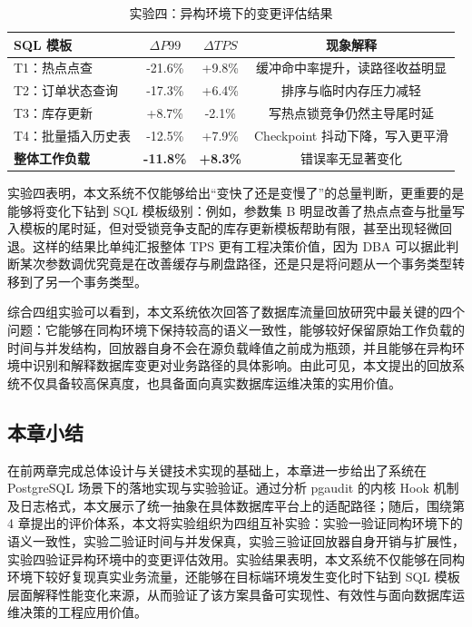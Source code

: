 \begin{table}[htbp]
    \centering
    \caption{实验四：异构环境下的变更评估结果}
    \label{tab:change_case_result}
    \begin{tabular}{lccc}
        \toprule
        \textbf{SQL 模板} & \textbf{$\Delta P99$} & \textbf{$\Delta TPS$} & \textbf{现象解释} \\
        \midrule
        T1：热点点查 & -21.6\% & +9.8\% & 缓冲命中率提升，读路径收益明显 \\
        T2：订单状态查询 & -17.3\% & +6.4\% & 排序与临时内存压力减轻 \\
        T3：库存更新 & +8.7\% & -2.1\% & 写热点锁竞争仍然主导尾时延 \\
        T4：批量插入历史表 & -12.5\% & +7.9\% & Checkpoint 抖动下降，写入更平滑 \\
        \midrule
        \textbf{整体工作负载} & \textbf{-11.8\%} & \textbf{+8.3\%} & 错误率无显著变化 \\
        \bottomrule
    \end{tabular}
\end{table}

实验四表明，本文系统不仅能够给出“变快了还是变慢了”的总量判断，更重要的是能够将变化下钻到 SQL 模板级别：例如，参数集 B 明显改善了热点点查与批量写入模板的尾时延，但对受锁竞争支配的库存更新模板帮助有限，甚至出现轻微回退。这样的结果比单纯汇报整体 TPS 更有工程决策价值，因为 DBA 可以据此判断某次参数调优究竟是在改善缓存与刷盘路径，还是只是将问题从一个事务类型转移到了另一个事务类型。

综合四组实验可以看到，本文系统依次回答了数据库流量回放研究中最关键的四个问题：它能够在同构环境下保持较高的语义一致性，能够较好保留原始工作负载的时间与并发结构，回放器自身不会在源负载峰值之前成为瓶颈，并且能够在异构环境中识别和解释数据库变更对业务路径的具体影响。由此可见，本文提出的回放系统不仅具备较高保真度，也具备面向真实数据库运维决策的实用价值。

\subsection{本章小结}

在前两章完成总体设计与关键技术实现的基础上，本章进一步给出了系统在 PostgreSQL 场景下的落地实现与实验验证。通过分析 pgaudit 的内核 Hook 机制及日志格式，本文展示了统一抽象在具体数据库平台上的适配路径；随后，围绕第 4 章提出的评价体系，本文将实验组织为四组互补实验：实验一验证同构环境下的语义一致性，实验二验证时间与并发保真，实验三验证回放器自身开销与扩展性，实验四验证异构环境中的变更评估效用。实验结果表明，本文系统不仅能够在同构环境下较好复现真实业务流量，还能够在目标端环境发生变化时下钻到 SQL 模板层面解释性能变化来源，从而验证了该方案具备可实现性、有效性与面向数据库运维决策的工程应用价值。
